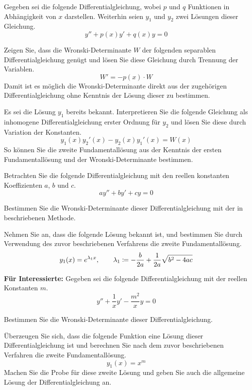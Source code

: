 \begin{atiTask}[
	title = Die Wronski-Determinante,
	lecture = Mathematische Methoden der Physik I,
	topic = Gewöhnliche Differentialgleichungen,
	subtopic = Die lineare homogene Differentialgleichung 2. Ordnung mit konstanten Koeffizienten,
	language = Deutsch
]
	Gegeben sei die folgende Differentialgleichung, wobei $p$ und $q$ Funktionen in Abhängigkeit von $x$ darstellen.
	Weiterhin seien $y_1$ und $y_2$ zwei Lösungen dieser Gleichung.
	\[
		y'' + p(x)y' + q(x)y = 0
	\]
	\begin{atiSubtasks}
		\item{
			Zeigen Sie, dass die Wronski-Determinante $W$ der folgenden separablen Differentialgleichung genügt und lösen Sie diese Gleichung durch Trennung der Variablen.
			\[
				W' = -p(x)\cdot W
			\]
			Damit ist es möglich die Wronski-Determinante direkt aus der zugehörigen Differentialgleichung ohne Kenntnis der Lösung dieser zu bestimmen.
		}
		\item{
			Es sei die Lösung $y_1$ bereits bekannt.
			Interpretieren Sie die folgende Gleichung als inhomogene Differentialgleichung erster Ordnung für $y_2$ und lösen Sie diese durch Variation der Konstanten.
			\[
				y_1(x)y_2'(x)-y_2(x)y_1'(x) = W(x)
			\]
			So können Sie die zweite Fundamentallösung aus der Kenntnis der ersten Fundamentallösung und der Wronski-Determinante bestimmen.
		}
		\item{
			Betrachten Sie die folgende Differentialgleichung mit den reellen konstanten Koeffizienten $a$, $b$ und $c$.
			\[
				ay'' + by' + cy = 0
			\]
			\begin{atiSubsubtasks}
				\item{
					Bestimmen Sie die Wronski-Determinante dieser Differentialgleichung mit der in  beschriebenen Methode.
				}
				\item{
					Nehmen Sie an, dass die folgende Lösung bekannt ist, und bestimmen Sie durch Verwendung des zuvor beschriebenen Verfahrens die zweite Fundamentallösung.
					\[
						y_1(x) = e^{\lambda_1 x} ,\qquad \lambda_1 \coloneqq -\frac{b}{2a} + \frac{1}{2a}\sqrt{b^2-4ac}
					\]
				}
			\end{atiSubsubtasks}
		}
		\item{
			\textbf{Für Interessierte:}
			Gegeben sei die folgende Differentialgleichung mit der reellen Konstanten $m$.
			\[
				y'' + \frac{1}{x} y' - \frac{m^2}{x}y = 0
			\]
			\begin{atiSubsubtasks}
				\item{
					Bestimmen Sie die Wronski-Determinante dieser Differentialgleichung.
				}
				\item{
					Überzeugen Sie sich, dass die folgende Funktion eine Lösung dieser Differentialgleichung ist und berechnen Sie nach dem zuvor beschriebenen Verfahren die zweite Fundamentallösung.
					\[
						y_1(x) = x^m
					\]
					Machen Sie die Probe für diese zweite Lösung und geben Sie auch die allgemeine Lösung der Differentialgleichung an.
				}
			\end{atiSubsubtasks}
		}
	\end{atiSubtasks}
\end{atiTask}